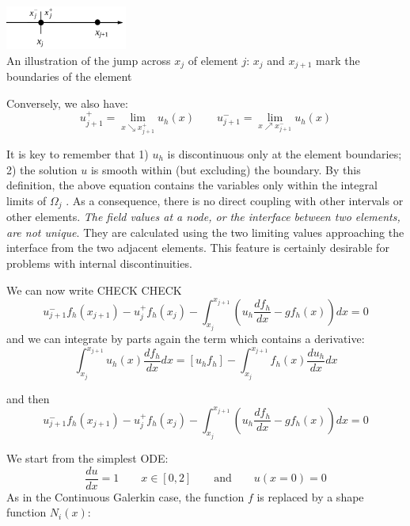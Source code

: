 \begin{center}
\includegraphics[width=4cm]{images/dgfem/dgfem_1}\\
{\scriptsize An illustration of the jump across $x_j$ of element $j$: 
$x_j$ and $x_{j+1}$ mark the
boundaries of the element}
\end{center}

Conversely, we also have:
\begin{equation}
u_{j+1}^+ = \lim_{x \searrow x_{j+1}^+} u_h(x)
\qquad
u_{j+1}^- = \lim_{x \nearrow x_{j+1}^-} u_h(x)
\end{equation}



It is key to remember that 1) $u_h$ is discontinuous only at the element boundaries; 
2) the solution $u$ is smooth within (but excluding) the boundary. 
By this definition, the above equation contains the variables only within the integral limits of $\Omega_j$ . 
As a consequence, there is no direct coupling with other intervals or other elements. 
{\sl The field values at a node, or the interface between two elements, are not unique}. They are
calculated using the two limiting values approaching the interface from the two
adjacent elements. This feature is certainly desirable for problems with internal
discontinuities.

We can now write CHECK CHECK
\begin{equation}
u_{j+1}^- f_h(x_{j+1}) - u_j^+ f_h(x_{j}) 
-\int_{x_j}^{x_{j+1}} \left( u_h \frac{d f_h}{dx} - g f_h(x)\right)  dx = 0
\end{equation}
and we can integrate by parts again the term which contains a derivative:
\[
\int_{x_j}^{x_{j+1}} u_h(x) \frac{d f_h}{dx} dx = [u_h f_h] -  \int_{x_j}^{x_{j+1}} f_h(x) \frac{d u_h}{dx} dx 
\]

and then 
\begin{equation}
u_{j+1}^- f_h(x_{j+1}) - u_j^+ f_h(x_{j}) 
-\int_{x_j}^{x_{j+1}} \left( u_h \frac{d f_h}{dx} - g f_h(x)\right)  dx = 0
\end{equation}




\newpage
We start from the simplest ODE:
\[
\frac{du}{dx}=1  \qquad x\in[0,2] \qquad \text{and} \qquad u(x=0)=0
\]
As in the Continuous Galerkin case, the function $f$ is replaced by a shape function $N_i(x)$:




